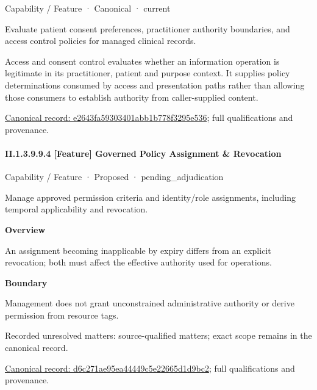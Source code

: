 \label{element:e2643fa59303401abb1b778f3295e536}
{\small Capability / Feature · Canonical · current}\par

Evaluate patient consent preferences, practitioner authority boundaries, and access control policies for managed clinical records.



Access and consent control evaluates whether an information operation is legitimate in its practitioner, patient and purpose context. It supplies policy determinations consumed by access and presentation paths rather than allowing those consumers to establish authority from caller-supplied content.


{\footnotesize \href{../../../../continuum/strategy/capability/feature/e2643fa59303401abb1b778f3295e536.md}{Canonical record: e2643fa59303401abb1b778f3295e536}; full qualifications and provenance.}\par
\paragraph*{II.1.3.9.9.4 [Feature] Governed Policy Assignment \& Revocation}
\label{navigation:II.1.3.9.9.4}

\label{element:d6c271ae95ea44449c5e22665d1d9bc2}
{\small Capability / Feature · Proposed · pending\_adjudication}\par

Manage approved permission criteria and identity/role assignments, including temporal applicability and revocation.



\textbf{Overview}



An assignment becoming inapplicable by expiry differs from an explicit revocation; both must affect the effective authority used for operations.



\textbf{Boundary}



Management does not grant unconstrained administrative authority or derive permission from resource tags.


{\small Recorded unresolved matters: source-qualified matters; exact scope remains in the canonical record.}\par
{\footnotesize \href{../../../../continuum/strategy/capability/feature/d6c271ae95ea44449c5e22665d1d9bc2.md}{Canonical record: d6c271ae95ea44449c5e22665d1d9bc2}; full qualifications and provenance.}\par
